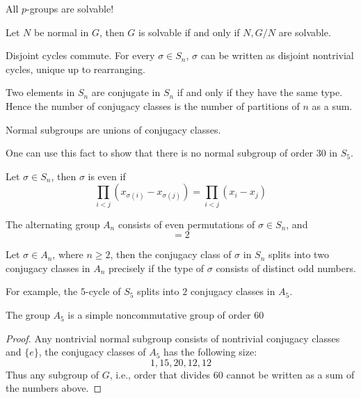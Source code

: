 \documentclass[openany]{book}
\begin{document}
\begin{prop}
    All $p$-groups are solvable!
\end{prop}

\begin{prop}
    Let $N$ be normal in $G$, then $G$ is solvable if and only if $N, G/N$ are solvable.
\end{prop}

\begin{prop}
    Disjoint cycles commute. For every $\sigma\in S_n$, $\sigma$ can be written as disjoint nontrivial cycles, unique up to rearranging.
\end{prop}

\begin{prop}
    Two elements in $S_n$ are conjugate in $S_n$ if and only if they have the same type. Hence the number of conjugacy classes is the number of partitions of $n$ as a sum.
\end{prop}

\begin{prop}
    Normal subgroups are unions of conjugacy classes. 

    One can use this fact to show that there is no normal subgroup of order 30 in $S_5$. 
\end{prop}

\begin{defn}
    Let $\sigma\in S_n$, then $\sigma$ is even if 
    \begin{equation*}
        \prod_{i<j}(x_{\sigma(i)}-x_{\sigma(j)})=\prod_{i<j}(x_i-x_j)
    \end{equation*}
\end{defn}

\begin{defn}
    The alternating group $A_n$ consists of even permutations of $\sigma\in S_n$, and 
    \begin{equation*}
        [S_n:A_n]=2
    \end{equation*}
\end{defn}


\begin{prop}
    Let $\sigma\in A_n$, where $n\geq 2$, then the conjugacy class of $\sigma$ in $S_n$ splits into two conjugacy classes in $A_n$ precisely if the type of $\sigma$ consists of distinct odd numbers. 

    For example, the $5$-cycle of $S_5$ splits into $2$ conjugacy classes in $A_5$.
\end{prop}

\begin{prop}
    The group $A_5$ is a simple noncommutative group of order $60$ 
\end{prop}
\begin{proof}
    Any nontrivial normal subgroup consists of nontrivial conjugacy classes and $\{e\}$, the conjugacy classes of $A_5$ has the following size:
    \begin{equation*}
        1, 15, 20, 12, 12
    \end{equation*}
    Thus any subgroup of $G$, i.e., order that divides $60$ cannot be written as a sum of the numbers above.
\end{proof}
\end{document}
